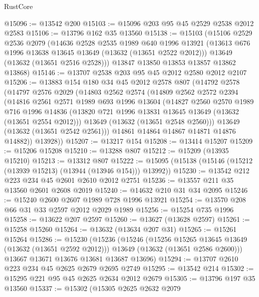 \begin{lexlean}{RustCore}
\begin{coremodule}
@15096 := @13542 @200
@15103 := @15096 @203 @95 @45 @2529 @2538 @2012 @2583
@15106 := @13796 @162 @35 @13560
@15138 := @15103
    (@15106
      @2529
      @2536
      @2079
      (@14636
        @2528
        @2535
        @1989
        @640
        @1996
        @13921
        (@13613 @676 @1996 @13638 @13645 @13649 (@13632 (@13651 @2522 @2012)))
        @13649
        (@13632 (@13651 @2516 @2528)))
      @13847
      @13850
      @13853
      @13857
      @13862
      @13868)
@15146 := @13707 @2538 @203 @95 @45 @2012 @2580 @2012 @2107
@15206 := @13883
    @154
    @180
    @34
    @45
    @2012
    @2578
    @807
    (@14792
      @2578
      (@14797
        @2576
        @2029
        (@14803
          @2562
          @2574
          (@14809
            @2562
            @2572
            @2394
            (@14816
              @2561
              @2571
              @1989
              @693
              @1996
              @13604
              (@14827
                @2560
                @2570
                @1989
                @716
                @1996
                @14836
                (@13820 @721 @1996 @13831 @13645 @13649 (@13632 (@13651 @2554 @2012)))
                @13649
                (@13632 (@13651 @2548 @2560)))
              @13649
              (@13632 (@13651 @2542 @2561)))
            @14861
            @14864
            @14867
            @14871
            @14876
            @14882))
        @13928))
@15207 := @13217 @154
@15208 := @13414 @15207
@15209 := @15206 @15208
@15210 := @13288 @807
@15212 := @15209 (@13935 @15210)
@15213 := @13312 @807
@15222 := @15095 (@15138 (@15146 (@15212 (@13939 @15213) (@13944 (@13946 @154))) @13992))
@15230 := @13542 @212 @223 @234 @45 @2601 @2610 @2012 @2751
@15236 := @13557 @211 @35 @13560 @2601 @2608 @2019
@15240 := @14632 @210 @31 @34 @2095
@15246 := @15240 @2600 @2607 @1989 @728 @1996 @13921
@15254 := @13570 @208 @66 @31 @33 @2597 @2012 @2029 @1989
@15256 := @15254 @735 @1996
@15258 := @13622 @207 @2597
@15260 := @13627 (@13628 @2597)
@15261 := @15258 @15260
@15264 := @13632 (@13634 @207 @31)
@15265 := @15261 @15264
@15286 := @15230
    (@15236
      (@15246
        (@15256 @15265 @13645 @13649 (@13632 (@13651 @2592 @2012)))
        @13649
        (@13632 (@13651 @2586 @2600)))
      @13667
      @13671
      @13676
      @13681
      @13687
      @13696)
@15294 := @13707 @2610 @223 @234 @45 @2625 @2679 @2695 @2749
@15295 := @13542 @214
@15302 := @15295 @221 @95 @45 @2625 @2634 @2012 @2679
@15305 := @13796 @197 @35 @13560
@15337 := @15302
    (@15305
      @2625
      @2632
      @2079

\end{coremodule}
\end{lexlean}
